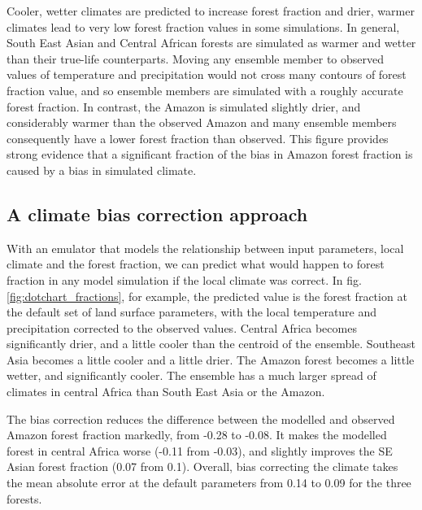 \documentclass[gmd, manuscript]{copernicus}
\begin{document}
Cooler, wetter climates are predicted to increase forest fraction and drier, warmer climates lead to very low forest fraction values in some simulations. In general, South East Asian and Central African forests are simulated as warmer and wetter than their true-life counterparts. Moving any ensemble member to observed values of temperature and precipitation would not cross many contours of forest fraction value, and so ensemble members are simulated with a roughly accurate forest fraction. In contrast, the Amazon is simulated slightly drier, and considerably warmer than the observed Amazon and many ensemble members consequently have a lower forest fraction than observed. This figure provides strong evidence that a significant fraction of the bias in Amazon forest fraction is caused by a bias in simulated climate.


\subsection{A climate bias correction approach}\label{ssec:bc_approach}
With an emulator that models the relationship between input parameters, local climate and the forest fraction, we can predict what would happen to forest fraction in any model simulation if the local climate was correct. In fig. \ref{fig:dotchart_fractions}, for example, the predicted value is the forest fraction at the default set of land surface parameters, with the local temperature and precipitation corrected to the observed values. Central Africa becomes significantly drier, and a little cooler than the centroid of the ensemble. Southeast Asia becomes a little cooler and a little drier. The Amazon forest becomes a little wetter, and significantly cooler. The ensemble has a much larger spread of climates in central Africa than South East Asia or the Amazon.

The bias correction reduces the difference between the modelled and observed Amazon forest fraction markedly, from -0.28 to -0.08. It makes the modelled forest in central Africa worse (-0.11 from -0.03), and slightly improves the SE Asian forest fraction (0.07 from 0.1). Overall, bias correcting the climate takes the mean absolute error at the default parameters from 0.14 to 0.09 for the three forests.
\end{document}
